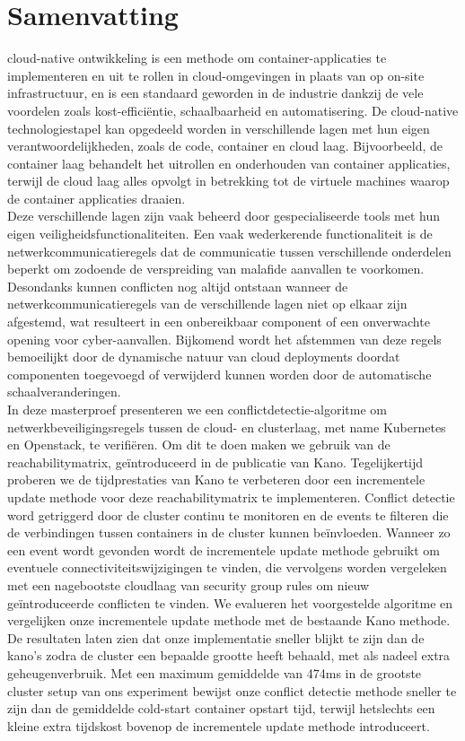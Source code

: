 \chapter{Samenvatting}                                 \label{ch:abstractNL}

cloud-native ontwikkeling is een methode om container-applicaties te implementeren en uit te rollen in cloud-omgevingen in plaats van op on-site infrastructuur, en is een standaard geworden in de industrie dankzij de vele voordelen zoals kost-efficiëntie, schaalbaarheid en automatisering. De cloud-native technologiestapel kan opgedeeld worden in verschillende lagen met hun eigen verantwoordelijkheden, zoals de code, container en cloud laag. Bijvoorbeeld, de container laag behandelt het uitrollen en onderhouden van container applicaties, terwijl de cloud laag alles opvolgt in betrekking tot de virtuele machines waarop de container applicaties draaien.
\\[10pt]

Deze verschillende lagen zijn vaak beheerd door gespecialiseerde tools met hun eigen veiligheidsfunctionaliteiten. Een vaak wederkerende functionaliteit is de netwerkcommunicatieregels dat de communicatie tussen verschillende onderdelen beperkt om zodoende de verspreiding van malafide aanvallen te voorkomen. Desondanks kunnen conflicten nog altijd ontstaan wanneer de netwerkcommunicatieregels van de verschillende lagen niet op elkaar zijn afgestemd, wat resulteert in een onbereikbaar component of een onverwachte opening voor cyber-aanvallen. Bijkomend wordt het afstemmen van deze regels bemoeilijkt door de dynamische natuur van cloud deployments doordat componenten toegevoegd of verwijderd kunnen worden door de automatische schaalveranderingen.
\\[10pt]

In deze masterproef presenteren we een conflictdetectie-algoritme om netwerkbeveiligingsregels tussen de cloud- en clusterlaag, met name Kubernetes en Openstack, te verifiëren. Om dit te doen maken we gebruik van de reachabilitymatrix, geïntroduceerd in de publicatie van Kano. Tegelijkertijd proberen we de tijdprestaties van Kano te verbeteren door een incrementele update methode voor deze reachabilitymatrix te implementeren. Conflict detectie word getriggerd door de cluster continu te monitoren en de events te filteren die de verbindingen tussen containers in de cluster kunnen beïnvloeden. Wanneer zo een event wordt gevonden wordt de incrementele update methode gebruikt om eventuele connectiviteitswijzigingen te vinden, die vervolgens worden vergeleken met een nagebootste cloudlaag van security group rules om nieuw geïntroduceerde conflicten te vinden. We evalueren het voorgestelde algoritme en vergelijken onze incrementele update methode met de bestaande Kano methode. De resultaten laten zien dat onze implementatie sneller blijkt te zijn dan de kano's zodra de cluster een bepaalde grootte heeft behaald, met als nadeel extra geheugenverbruik. Met een maximum gemiddelde van 474ms in de grootste cluster setup van ons experiment bewijst onze conflict detectie methode sneller te zijn dan de gemiddelde cold-start container opstart tijd, terwijl hetslechts een kleine extra tijdskost bovenop de incrementele update methode introduceert.
